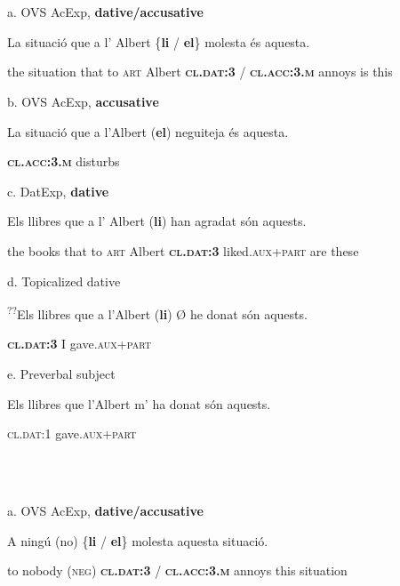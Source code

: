 \documentclass[output=paper,modfonts,nonflat]{langsci/langscibook}
\begin{document}
\ea%
    \label{ex:key:10}
    \gll\\
        \\
    \glt
    \z

         a. OVS AcExp, \textbf{dative/accusative}

           La  situació  que  a  l’    Albert \{\textbf{li}              / \textbf{el}\}               molesta és aquesta.

           the situation that to \textsc{art} Albert  \textbf{\textsc{cl.dat:3}} / \textbf{\textsc{cl.acc:3.m}} annoys  is this

       b. OVS AcExp, \textbf{accusative}

           La  situació  que a  l’Albert (\textbf{el})                 neguiteja és aquesta.

                                                         \textbf{\textsc{cl.acc}}\textbf{:3.\textsc{m}} disturbs

       c. DatExp, \textbf{dative}

           Els llibres que a  l’     Albert (\textbf{li})             han agradat        són aquests.

           the books that to \textsc{art} Albert  \textbf{\textsc{cl.dat:3}} liked.\textsc{aux+part} are  these

       d. Topicalized dative

           \textsuperscript{??}Els llibres que a  l’Albert (\textbf{li})             Ø he donat            són aquests.

                                                        \textbf{\textsc{cl.dat:3}}  I  gave.\textsc{aux+part}

       e. Preverbal subject

           Els llibres que l’Albert m’           ha donat            són aquests.

                                                \textsc{cl.dat:1} gave.\textsc{aux+part}

\ea%
    \label{ex:key:11}
    \gll\\
        \\
    \glt
    \z

         a. OVS AcExp, \textbf{dative/accusative}

           A ningú     (no) \{\textbf{li}              / \textbf{el}\}                molesta aquesta situació.

           to nobody (\textsc{neg}) \textbf{\textsc{cl.dat:3}} / \textbf{\textsc{cl.acc:3.m}} annoys  this       situation
\end{document}
